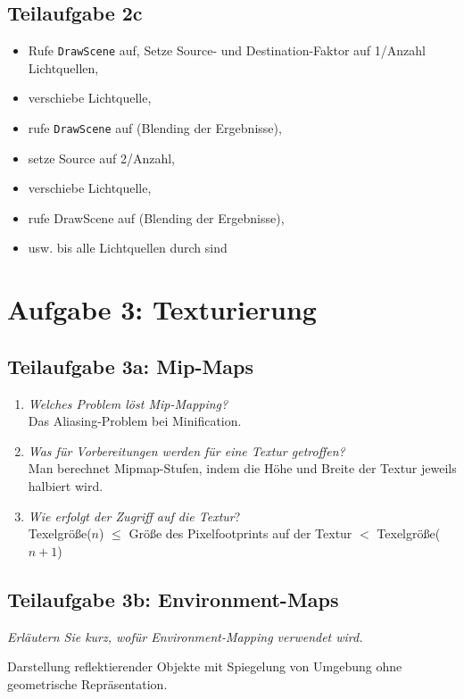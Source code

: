 \documentclass[a4paper]{scrartcl}
\begin{document}
\subsection*{Teilaufgabe 2c}
\begin{itemize}
    \item Rufe \texttt{DrawScene} auf, Setze Source- und Destination-Faktor auf
          1/Anzahl Lichtquellen,
    \item verschiebe Lichtquelle,
    \item rufe \texttt{DrawScene} auf (Blending der Ergebnisse),
    \item setze Source auf 2/Anzahl,
    \item verschiebe Lichtquelle,
    \item rufe DrawScene auf (Blending der Ergebnisse),
    \item usw. bis alle Lichtquellen durch sind
\end{itemize}

\section*{Aufgabe 3: Texturierung}
\subsection*{Teilaufgabe 3a: Mip-Maps}
\begin{enumerate}[label=(\roman*)]
    \item \textit{Welches Problem löst Mip-Mapping?}\\
          Das Aliasing-Problem bei Minification.
    \item \textit{Was für Vorbereitungen werden für eine Textur getroffen?}\\
          Man berechnet Mipmap-Stufen, indem die Höhe und Breite der Textur
          jeweils halbiert wird.
    \item \textit{Wie erfolgt der Zugriff auf die Textur}?\\
          Texelgröße($n$) $\leq$ Größe des Pixelfootprints auf der Textur $<$ Texelgröße($n+1$)
\end{enumerate}

\subsection*{Teilaufgabe 3b: Environment-Maps}
\textit{Erläutern Sie kurz, wofür Environment-Mapping verwendet wird.}

Darstellung reflektierender Objekte mit Spiegelung von Umgebung ohne
geometrische Repräsentation.
\end{document}
